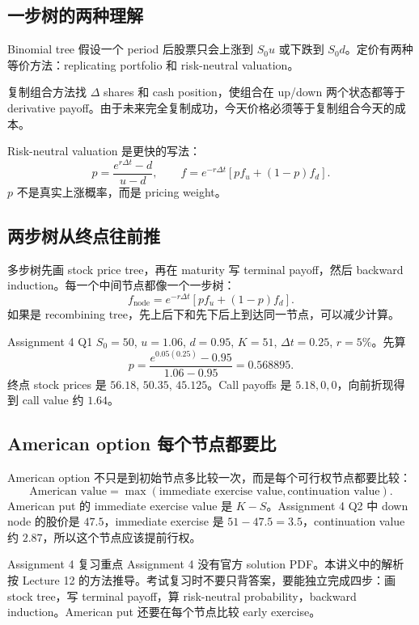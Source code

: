 \subsection{一步树的两种理解}
Binomial tree 假设一个 period 后股票只会上涨到 $S_0u$ 或下跌到 $S_0d$。定价有两种等价方法：replicating portfolio 和 risk-neutral valuation。

复制组合方法找 $\Delta$ shares 和 cash position，使组合在 up/down 两个状态都等于 derivative payoff。由于未来完全复制成功，今天价格必须等于复制组合今天的成本。

Risk-neutral valuation 是更快的写法：
\[
p=\frac{e^{r\Delta t}-d}{u-d},\qquad
f=e^{-r\Delta t}[pf_u+(1-p)f_d].
\]
$p$ 不是真实上涨概率，而是 pricing weight。

\subsection{两步树从终点往前推}
多步树先画 stock price tree，再在 maturity 写 terminal payoff，然后 backward induction。每一个中间节点都像一个一步树：
\[
f_{\text{node}}=e^{-r\Delta t}[pf_u+(1-p)f_d].
\]
如果是 recombining tree，先上后下和先下后上到达同一节点，可以减少计算。

\begin{examplebox}{Assignment 4 Q1}
$S_0=50$, $u=1.06$, $d=0.95$, $K=51$, $\Delta t=0.25$, $r=5\%$。先算
\[
p=\frac{e^{0.05(0.25)}-0.95}{1.06-0.95}=0.568895.
\]
终点 stock prices 是 $56.18$, $50.35$, $45.125$。Call payoffs 是 $5.18,0,0$，向前折现得到 call value 约 $1.64$。
\end{examplebox}

\subsection{American option 每个节点都要比}
American option 不只是到初始节点多比较一次，而是每个可行权节点都要比较：
\[
\text{American value}=\max(\text{immediate exercise value},\text{continuation value}).
\]
American put 的 immediate exercise value 是 $K-S$。Assignment 4 Q2 中 down node 的股价是 $47.5$，immediate exercise 是 $51-47.5=3.5$，continuation value 约 $2.87$，所以这个节点应该提前行权。

\begin{warningbox}{Assignment 4 复习重点}
Assignment 4 没有官方 solution PDF。本讲义中的解析按 Lecture 12 的方法推导。考试复习时不要只背答案，要能独立完成四步：画 stock tree，写 terminal payoff，算 risk-neutral probability，backward induction。American put 还要在每个节点比较 early exercise。
\end{warningbox}
